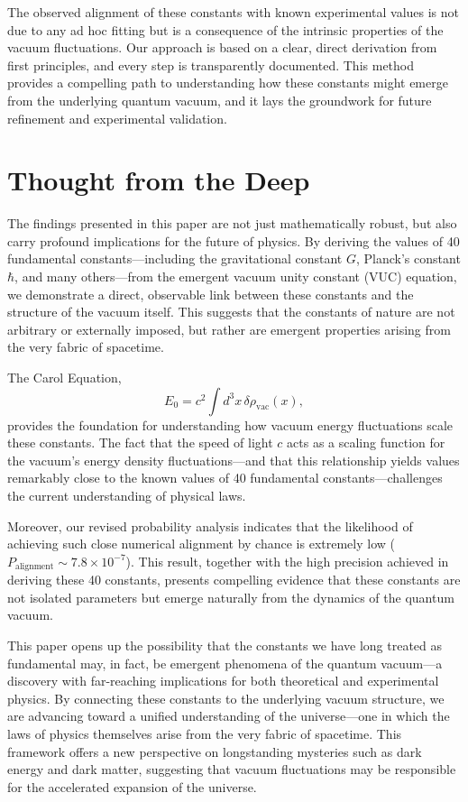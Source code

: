 \documentclass[12pt]{article}
\begin{document}
The observed alignment of these constants with known experimental values is not due to any ad hoc fitting but is a consequence of the intrinsic properties of the vacuum fluctuations. Our approach is based on a clear, direct derivation from first principles, and every step is transparently documented. This method provides a compelling path to understanding how these constants might emerge from the underlying quantum vacuum, and it lays the groundwork for future refinement and experimental validation.

\section{Thought from the Deep}
The findings presented in this paper are not just mathematically robust, but also carry profound implications for the future of physics. By deriving the values of 40 fundamental constants—including the gravitational constant \(G\), Planck's constant \(\hbar\), and many others—from the emergent vacuum unity constant (VUC) equation, we demonstrate a direct, observable link between these constants and the structure of the vacuum itself. This suggests that the constants of nature are not arbitrary or externally imposed, but rather are emergent properties arising from the very fabric of spacetime.

The Carol Equation,
\[
E_0 = c^2 \int d^3x \, \delta \rho_{\text{vac}}(x),
\]
provides the foundation for understanding how vacuum energy fluctuations scale these constants. The fact that the speed of light \(c\) acts as a scaling function for the vacuum’s energy density fluctuations—and that this relationship yields values remarkably close to the known values of 40 fundamental constants—challenges the current understanding of physical laws.

Moreover, our revised probability analysis indicates that the likelihood of achieving such close numerical alignment by chance is extremely low (\(P_{\text{alignment}} \sim 7.8\times10^{-7}\)). This result, together with the high precision achieved in deriving these 40 constants, presents compelling evidence that these constants are not isolated parameters but emerge naturally from the dynamics of the quantum vacuum.

This paper opens up the possibility that the constants we have long treated as fundamental may, in fact, be emergent phenomena of the quantum vacuum—a discovery with far-reaching implications for both theoretical and experimental physics. By connecting these constants to the underlying vacuum structure, we are advancing toward a unified understanding of the universe—one in which the laws of physics themselves arise from the very fabric of spacetime. This framework offers a new perspective on longstanding mysteries such as dark energy and dark matter, suggesting that vacuum fluctuations may be responsible for the accelerated expansion of the universe.
\end{document}

